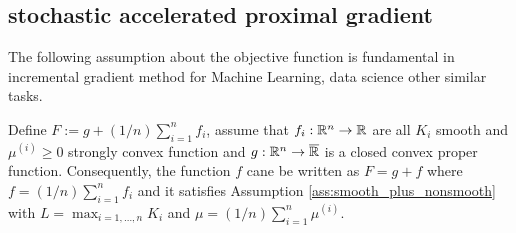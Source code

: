 \documentclass[12pt]{article}
\begin{document}
    \subsection{stochastic accelerated proximal gradient}
        The following assumption about the objective function is fundamental in incremental gradient method for Machine Learning, data science other similar tasks. 
        \begin{assumption}\label{ass:sum-of-many}
            Define $F := g + (1/n)\sum_{i = 1}^{n} f_i$, assume that $f_i:\mathbb R^n \rightarrow  \mathbb R$ are all $K_i$ smooth and $\mu^{(i)} \ge 0$ strongly convex function and $g:\mathbb R^n \rightarrow \overline {\mathbb R}$ is a closed convex proper function. 
            Consequently, the function $f$ cane be written as $F = g + f$ where $f = (1/n)\sum_{i = 1}^{n} f_i$ and it satisfies Assumption \ref{ass:smooth_plus_nonsmooth} with $L = \max_{i = 1, \ldots, n}K_i$ and $\mu = (1/n)\sum_{i = 1}^{n}\mu^{(i)}$. 
        \end{assumption}
        \begin{definition}[SNAPG]\label{def:snapg}
            
        \end{definition}
    



\end{document}
